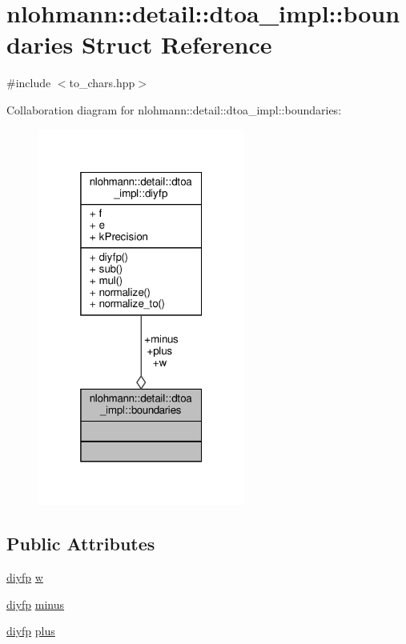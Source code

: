 \hypertarget{structnlohmann_1_1detail_1_1dtoa__impl_1_1boundaries}{}\section{nlohmann\+:\+:detail\+:\+:dtoa\+\_\+impl\+:\+:boundaries Struct Reference}
\label{structnlohmann_1_1detail_1_1dtoa__impl_1_1boundaries}


{\ttfamily \#include $<$to\+\_\+chars.\+hpp$>$}



Collaboration diagram for nlohmann\+:\+:detail\+:\+:dtoa\+\_\+impl\+:\+:boundaries\+:\nopagebreak
\begin{figure}[H]
\begin{center}
\leavevmode
\includegraphics[width=193pt]{structnlohmann_1_1detail_1_1dtoa__impl_1_1boundaries__coll__graph}
\end{center}
\end{figure}
\subsection*{Public Attributes}
\begin{DoxyCompactItemize}
\item 
\hyperlink{structnlohmann_1_1detail_1_1dtoa__impl_1_1diyfp}{diyfp} \hyperlink{structnlohmann_1_1detail_1_1dtoa__impl_1_1boundaries_ad1668c60aeade5f2557fafed8b8aee1a}{w}
\item 
\hyperlink{structnlohmann_1_1detail_1_1dtoa__impl_1_1diyfp}{diyfp} \hyperlink{structnlohmann_1_1detail_1_1dtoa__impl_1_1boundaries_aec4e5028333c01f3229062f31ce16763}{minus}
\item 
\hyperlink{structnlohmann_1_1detail_1_1dtoa__impl_1_1diyfp}{diyfp} \hyperlink{structnlohmann_1_1detail_1_1dtoa__impl_1_1boundaries_a3321ae2816a6ec5250a0d8e29f798232}{plus}
\end{DoxyCompactItemize}


